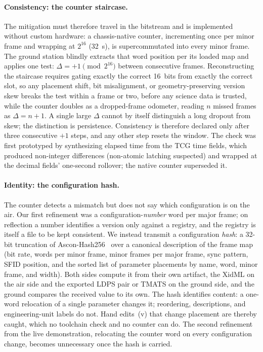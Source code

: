\documentclass[12pt,letterpaper]{article}
\begin{document}
\paragraph{Consistency: the counter staircase.}
The mitigation must therefore travel in the bitstream and is implemented without custom
hardware: a chassis-native counter, incrementing once per minor frame and wrapping at
$2^{16}$ (32~s), is supercommutated into every minor frame. The ground station blindly
extracts that word position per its loaded map and applies one test: $\Delta = +1 \pmod
{2^{16}}$ between consecutive frames. Reconstructing the staircase requires gating exactly
the correct 16~bits from exactly the correct slot, so any placement shift, bit
misalignment, or geometry-preserving version skew breaks the test within a frame or two,
before any science data is trusted, while the counter doubles as a dropped-frame odometer,
reading $n$ missed frames as $\Delta = n{+}1$. A single large $\Delta$ cannot by itself
distinguish a long dropout from skew; the distinction is persistence. Consistency is
therefore declared only after three consecutive $+1$ steps, and any other step resets the
window. The check was first prototyped by synthesizing elapsed time from the TCG time
fields, which produced non-integer differences (non-atomic latching suspected) and wrapped
at the decimal fields' one-second rollover; the native counter superseded it.

\paragraph{Identity: the configuration hash.}
The counter detects a mismatch but does not say which configuration is on the air. Our
first refinement was a configuration-\emph{number} word per major frame; on reflection a
number identifies a version only against a registry, and the registry is itself a file to
be kept consistent. We instead transmit a configuration \emph{hash}: a 32-bit truncation of
Ascon-Hash256~\cite{nist800232} over a canonical description of the frame map (bit rate,
words per minor frame, minor frames per major frame, sync pattern, SFID position, and the
sorted list of parameter placements by name, word, minor frame, and width). Both sides
compute it from their own artifact, the XidML on the air side and the exported LDPS pair or
TMATS on the ground side, and the ground compares the received value to its own. The hash
identifies content: a one-word relocation of a single parameter changes it; reordering,
descriptions, and engineering-unit labels do not. Hand edits~(v) that change placement are
thereby caught, which no toolchain check and no counter can do. The second refinement from
the live demonstration, relocating the counter word on every configuration change, becomes
unnecessary once the hash is carried.
\end{document}
